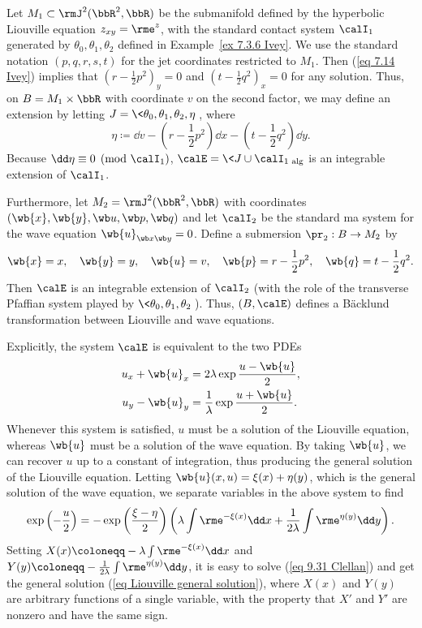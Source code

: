 \begin{example}
    Let $M_1\subset \rmJ^2(\bbR^2,\bbR)$ be the submanifold defined by the hyperbolic Liouville equation $z_{xy}=\rme^z$, with the standard contact system $\calI_1$ generated by $\theta_0,\theta_1,\theta_2$ defined in Example~\ref{ex 7.3.6 Ivey}. We use the standard notation $(p,q,r,s,t)$ for the jet coordinates restricted to $M_1$. Then (\ref{eq 7.14 Ivey}) implies that $(r-\frac12p^2)_y=0$ and $(t-\frac12q^2)_x=0$ for any solution. Thus, on $B=M_1\times \bbR$ with coordinate $v$ on the second factor, we may define an extension by letting $J=\<\theta_0,\theta_1,\theta_2,\eta\>$, where 
    \[\eta\coloneqq \dd v-(r-\frac12 p^2)\dd x-(t-\frac12 q^2)\dd y.\]
    Because $\dd\eta\equiv 0\pmod{\calI_1}$, $\calE=\<J\cup\calI_1\>_{\mathrm{alg}}$ is an integrable extension of $\calI_1$.

    Furthermore, let $M_2=\rmJ^2(\bbR^2,\bbR)$ with coordinates $(\wb{x},\wb{y},\wb u,\wb p,\wb q)$ and let $\calI_2$ be the standard \gls{ma} system for the wave equation $\wb{u}_{\wb x\wb y}=0$. Define a submersion $\pr_2:B\to M_2$ by 
    \[\wb{x}=x,\quad\wb{y}=y,\quad \wb{u}=v,\quad \wb{p}=r-\frac12 p^2,\quad \wb{q}=t-\frac12 q^2.\]
    Then $\calE$ is an integrable extension of $\calI_2$ (with the role of the transverse Pfaffian system played by $\<\theta_0,\theta_1,\theta_2\>$). Thus, $(B,\calE)$ defines a B\"acklund transformation between Liouville and wave equations.

    Explicitly, the system $\calE$ is equivalent to the two PDEs
    \begin{align}
        u_x+\wb{u}_x&=2\lambda \exp\frac{u-\wb{u}}{2},\\
        u_y-\wb{u}_y&=\frac{1}{\lambda}\exp \frac{u+\wb{u}}{2}.
    \end{align}
    Whenever this system is satisfied, $u$ must be a solution of the Liouville equation, whereas $\wb{u}$ must be a solution of the wave equation. By taking $\wb{u}$, we can recover $u$ up to a constant of integration, thus producing the general solution of the Liouville equation. Letting  $\wb{u}(x,u)=\xi(x)+\eta(y)$, which is the general solution of the wave equation, we separate variables in the above system to find
    \[\exp\left(-\frac{u}{2}\right)=-\exp\left(\frac{\xi-\eta}{2}\right)\left(\lambda\int \rme^{-\xi(x)}\dd x+\frac{1}{2\lambda}\int \rme^{\eta(y)}\dd y\right).\label{eq 9.31 Clellan}\]
    Setting $X(x)\coloneqq -\lambda\int \rme^{-\xi(x)}\dd x$ and $Y(y)\coloneqq -\frac{1}{2\lambda}\int \rme^{\eta(y)}\dd y$, it is easy to solve (\ref{eq 9.31 Clellan}) and get the general solution (\ref{eq Liouville general solution}), where $X(x)$ and $Y(y)$ are arbitrary functions of a single variable, with the property that $X'$ and $Y'$ are nonzero and have the same sign.
\end{example}



